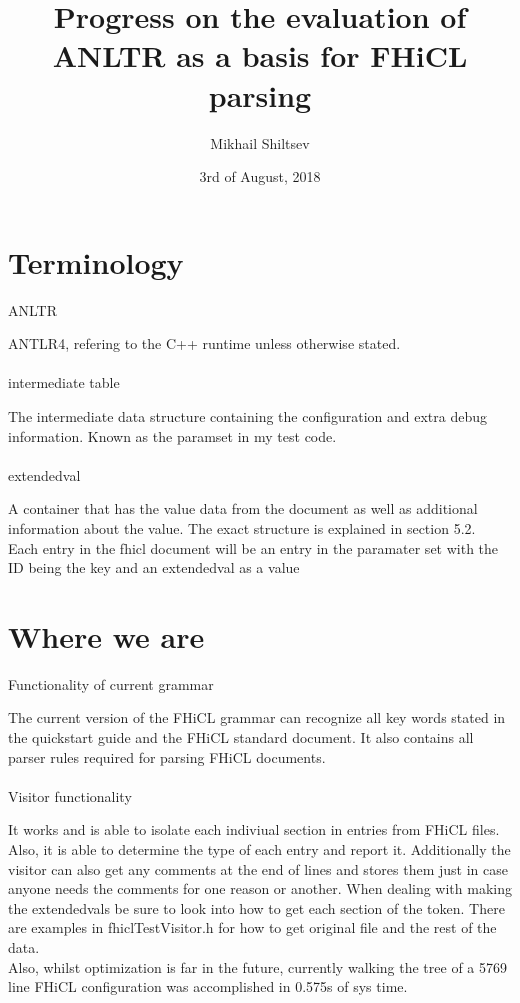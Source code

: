\documentclass{article}
\title{Progress on the evaluation of ANLTR as a basis for FHiCL parsing}
\author{Mikhail Shiltsev}
\date{3rd of August, 2018}
\begin{document}
\section{Terminology}
    ANLTR

    	\quad ANTLR4, refering to the C++ runtime unless otherwise stated.\\ \\
    intermediate table 

    	\quad The intermediate data structure containing the configuration and extra debug information. Known as the paramset in my test code. \\ \\
    extendedval

    	\quad A container that has the value data from the document as well as additional information about the value. The exact structure is explained in section 5.2.  \\

    Each entry in the fhicl document will be an entry in the paramater set with the ID being the key and an extendedval as a value


\section{Where we are}

Functionality of current grammar
      
\quad The current version of the FHiCL grammar can recognize all key words stated in the quickstart guide and the FHiCL standard document. It also contains all parser rules required for parsing FHiCL documents. \\ \\ Visitor functionality
    	
\quad It works and is able to isolate each indiviual section in entries from FHiCL files. Also, it is able to determine the type of each entry and report it. Additionally the visitor can also get any comments at the end of lines and stores them just in case anyone needs the comments for one reason or another. When dealing with making the extendedvals be sure to look into how to get each section of the token. There are examples in fhiclTestVisitor.h for how to get original file and the rest of the data.\\

\quad Also, whilst optimization is far in the future, currently walking the tree of a 5769 line FHiCL configuration was accomplished in 0.575s of sys time. 
\end{document}
